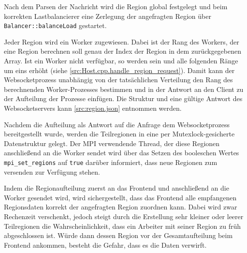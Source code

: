 Nach dem Parsen der Nachricht wird die Region global festgelegt und beim korrekten Lastbalancierer eine Zerlegung der angefragten Region über \verb|Balancer::balanceLoad| gestartet.

Jeder Region wird ein Worker zugewiesen.
Dabei ist der Rang des Workers, der eine Region berechnen soll genau der Index der Region in dem zurückgegebenen Array.
Ist ein Worker nicht verfügbar, so werden sein und alle folgenden Ränge um eins erhöht (siehe \autoref{src:Host.cpp.handle_region_request}).
Damit kann der Websocketprozess unabhängig von der tatsächlichen Verteilung den Rang des berechnenden Worker-Prozesses
bestimmen und in der Antwort an den Client zu der Aufteilung der Prozesse einfügen.
Die Struktur und eine gültige Antwort des Websocketservers kann \autoref{src:region.json} entnommen werden.

Nachdem die Aufteilung als Antwort auf die Anfrage dem Websocketprozess bereitgestellt wurde, werden die Teilregionen in eine per Mutexlock-gesicherte Datenstruktur
gelegt. Der MPI verwendende Thread, der diese Regionen anschließend an die Worker sendet wird über das Setzen des booleschen Wertes \verb|mpi_set_regions|
auf \verb|true| darüber informiert, dass neue Regionen zum versenden zur Verfügung stehen.

Indem die Regionaufteilung zuerst an das Frontend und anschließend an die Worker gesendet wird,
wird sichergestellt, dass das Frontend alle empfangenen Regionsdaten korrekt der angefragten Region zuordnen kann.
Dabei wird zwar Rechenzeit verschenkt, jedoch steigt durch die Erstellung sehr kleiner oder leerer Teilregionen
die Wahrscheinlichkeit, dass ein Arbeiter mit seiner Region zu früh abgeschlossen ist.
Würde dann dessen Region vor der Gesamtaufteilung beim Frontend ankommen, besteht die Gefahr,
dass es die Daten verwirft.

\begin{figure}
	
\end{figure}

\begin{figure}
	
\end{figure}

